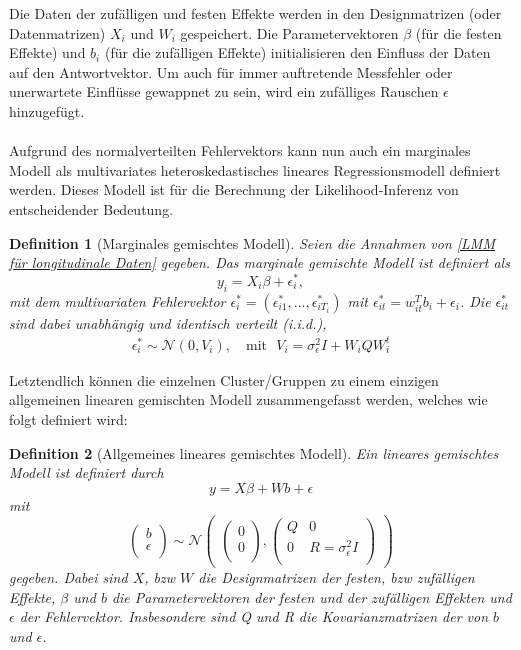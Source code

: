 \documentclass[%
thesis=student,%
coverpage=false,%
titlepage=false,%
headmarks=true, %
german,%
font=libertine, %
math=newpxtx, %
BCOR=5mm,%
coverBCOR=11mm%
]{tumbook}
\theoremstyle{break}
\newtheorem{definition}{Definition}[section]
\begin{document}
Die Daten der zufälligen und festen Effekte werden in den Designmatrizen (oder Datenmatrizen) $X_i$ und $W_i$  gespeichert. Die Parametervektoren $\beta$ (für die festen Effekte) und $b_i$ (für die zufälligen Effekte) initialisieren den Einfluss der Daten auf den Antwortvektor. Um auch für immer auftretende Messfehler oder unerwartete Einflüsse gewappnet zu sein, wird ein zufälliges Rauschen $\epsilon$ hinzugefügt.\\
\\
Aufgrund des normalverteilten Fehlervektors kann nun auch ein marginales Modell als multivariates heteroskedastisches lineares Regressionsmodell definiert werden. Dieses Modell ist für die Berechnung der Likelihood-Inferenz von entscheidender Bedeutung. 
\begin{definition}[Marginales gemischtes Modell]
	Seien die Annahmen von \ref{LMM für longitudinale Daten} gegeben. 
	Das marginale gemischte Modell ist definiert als
	$$ y_i = X_i\beta + \epsilon_i^*,$$
	mit dem multivariaten Fehlervektor $\epsilon_i^* = (\epsilon_{i1}^*,...,\epsilon_{iT_i}^*) $ mit $\epsilon_{it}^* = w_{it}^Tb_i + \epsilon_i$. 
	Die $\epsilon_{it}^*$ sind dabei unabhängig und identisch verteilt (i.i.d.),
	\begin{align}
		\epsilon_i^* \sim \mathcal{N}(0,V_i), \hspace{12pt}\text{mit} \hspace{8pt}V_i = \sigma_\epsilon^2I + W_i Q W_i^t 
	\end{align}
	\label{spez-marginales-Modell}
\end{definition} \noindent
Letztendlich können die einzelnen Cluster/Gruppen zu einem einzigen allgemeinen linearen gemischten Modell zusammengefasst werden, welches wie folgt definiert wird:
\begin{definition}[Allgemeines lineares gemischtes Modell]
	Ein lineares gemischtes Modell ist definiert durch
	$$y = X\beta + Wb + \epsilon $$
	mit $$\begin{pmatrix}
		b \\
		\epsilon \\
	\end{pmatrix}
	\sim
	\mathcal{N}
	\begin{pmatrix}
		\begin{pmatrix}
			
			0 \\
			0 \\
		\end{pmatrix},
		\begin{pmatrix}
			Q & 0 \\
			0 & R = \sigma_\epsilon^2I \\
		\end{pmatrix}
	\end{pmatrix}$$
	gegeben. Dabei sind $X$, bzw $W$ die Designmatrizen der festen, bzw zufälligen Effekte, $\beta$ und $b$ die Parametervektoren der festen und der zufälligen Effekten und $\epsilon$ der Fehlervektor. Insbesondere sind Q und R die Kovarianzmatrizen der von $b$ und $\epsilon$.
	\label{def:allg-lin-gem-Modell}
\end{definition}\noindent
\end{document}
